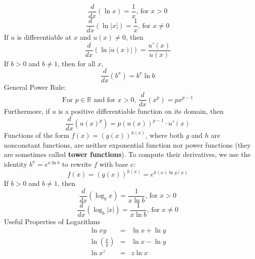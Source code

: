 \documentclass{article}
\begin{document}
\begin{itemize}
    $$\frac{d}{dx}\left(\ln{x}\right) = \frac{1}{x} \text{, for } x > 0$$
    $$\frac{d}{dx}\left(\ln{|x|}\right) = \frac{1}{x} \text{, for } x \neq 0$$
    If $u$ is differentiable at $x$ and $u(x) \neq 0$, then
    $$\frac{d}{dx}\left(\ln{|u(x)|}\right) = \frac{u'(x)}{u(x)}$$
    If $b > 0$ and $b \neq 1$, then for all $x$,
    $$\frac{d}{dx}\left(b^x\right) = b^x\ln{b}$$
    General Power Rule:
    $$\text{For } p \in \mathbb{R} \text{ and for } x > 0 \text{, } \frac{d}{dx}\left(x^p\right) = px^{p - 1}$$
    Furthermore, if $u$ is a positive differentiable function on its domain, then
    $$\frac{d}{dx}\left(u\left(x\right)^p\right) = p\left(u\left(x\right)\right)^{p - 1} \cdot u'\left(x\right)$$
    Functions of the form $f(x) = \left(g(x)\right)^{h(x)}$, where both $g$ and $h$ are nonconstant functions, are neither exponential function nor power functions (they are sometimes called \textbf{tower functions}). To compute their derivatives, we use the identity $b^x = e^{x\ln{b}}$ to rewrite $f$ with base $e$:
    $$f(x) = \left(g(x)\right)^{h(x)} = e^{h(x)\ln{g(x)}}$$
    If $b > 0$ and $b \neq 1$, then
    $$\frac{d}{dx}\left(\log_b{x}\right) = \frac{1}{x\ln{b}} \text{, for } x > 0$$
    $$\frac{d}{dx}\left(\log_b{|x|}\right) = \frac{1}{x\ln{b}} \text{, for } x \neq 0$$
    Useful Properties of Logarithms
    \begin{eqnarray}
        \ln{xy} &=& \ln{x} + \ln{y} \\
        \ln{\left(\frac{x}{y}\right)} &=& \ln{x} - \ln{y} \\
        \ln{x^z} &=& z\ln{x}
    \end{eqnarray}
\end{itemize}
\end{document}
